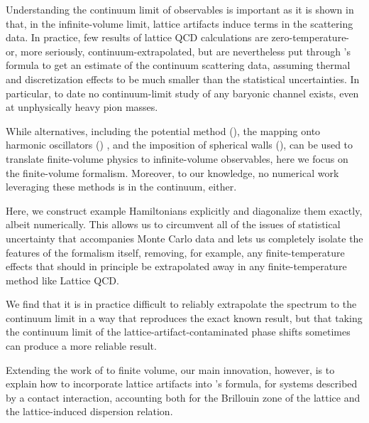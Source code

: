 Understanding the continuum limit of observables is important as it is shown in  that, in the infinite-volume limit, lattice artifacts induce terms in the scattering data.
In practice, few results of lattice QCD calculations are zero-temperature- or, more seriously, continuum-extrapolated, but are nevertheless put through \Luscher's formula to get an estimate of the continuum scattering data, assuming thermal and discretization effects to be much smaller than the statistical uncertainties.
In particular, to date no continuum-limit study of any baryonic channel exists, even at unphysically heavy pion masses.

While alternatives, including the potential method (), the mapping onto harmonic oscillators () , and the imposition of spherical walls (), can be used to translate finite-volume physics to infinite-volume observables, here we focus on the \Luscher finite-volume formalism.
Moreover, to our knowledge, no numerical work leveraging these methods is in the continuum, either.

Here, we construct example Hamiltonians explicitly and diagonalize them exactly, albeit numerically.
This allows us to circumvent all of the issues of statistical uncertainty that accompanies Monte Carlo data and lets us completely isolate the features of the formalism itself, removing, for example, any finite-temperature effects that should in principle be extrapolated away in any finite-temperature method like Lattice QCD.

We find that it is in practice difficult to reliably extrapolate the spectrum to the continuum limit in a way that reproduces the exact known result, but that taking the continuum limit of the lattice-artifact-contaminated phase shifts sometimes can produce a more reliable result.

Extending the work of  to finite volume, our main innovation, however, is to explain how to incorporate lattice artifacts into \Luscher's formula, for systems described by a contact interaction, accounting both for the Brillouin zone of the lattice and the lattice-induced dispersion relation.


